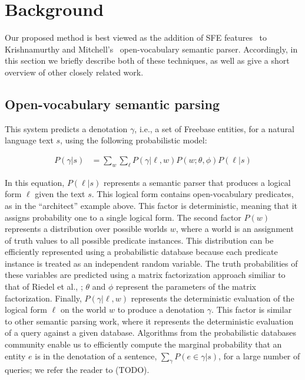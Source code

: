 \documentclass[11pt]{article}
\begin{document}
\section{Background}
\label{sec:background}

Our proposed method is best viewed as the addition of SFE
features~\cite{gardner-2015-sfe} to Krishnamurthy and
Mitchell's~
open-vocabulary semantic parser.  Accordingly, in this section we briefly
describe both of these techniques, as well as give a short overview of other
closely related work.

\subsection{Open-vocabulary semantic parsing}


This system predicts a denotation $\gamma$, i.e., a set of Freebase
entities, for a natural language text $s$, using the following
probabilistic model:

\begin{align*}
P(\gamma | s) & = \sum_w \sum_\ell P(\gamma | \ell, w) P(w ; \theta, \phi) P(\ell | s)
\end{align*}

In this equation, $P(\ell | s)$ represents a semantic parser that
produces a logical form $\ell$ given the text $s$. This logical form
contains open-vocabulary predicates, as in the ``architect'' example
above. This factor is deterministic, meaning that it assigns
probability one to a single logical form. The second factor $P(w)$
represents a distribution over possible worlds $w$, where a world is
an assignment of truth values to all possible predicate
instances. This distribution can be efficiently represented using a
probabilistic database because each predicate instance is treated as
an independent random variable. The truth probabilities of these
variables are predicted using a matrix factorization approach similiar
to that of Riedel et al., ;
$\theta$ and $\phi$ represent the parameters of the matrix
factorization. Finally, $P(\gamma | \ell, w)$ represents the
deterministic evaluation of the logical form $\ell$ on the world $w$
to produce a denotation $\gamma$. This factor is similar to other
semantic parsing work, where it represents the deterministic
evaluation of a query against a given database. Algorithms from the
probabilistic databases community enable us to efficiently compute the
marginal probability that an entity $e$ is in the denotation of a
sentence, $\sum_\gamma P(e \in \gamma | s)$, for a large number of
queries; we refer the reader to (TODO).
\end{document}
